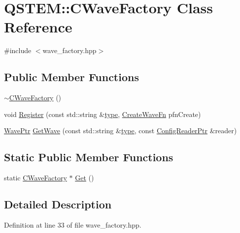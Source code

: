 \hypertarget{class_q_s_t_e_m_1_1_c_wave_factory}{\section{Q\-S\-T\-E\-M\-:\-:C\-Wave\-Factory Class Reference}
\label{class_q_s_t_e_m_1_1_c_wave_factory}
}


{\ttfamily \#include $<$wave\-\_\-factory.\-hpp$>$}

\subsection*{Public Member Functions}
\begin{DoxyCompactItemize}
\item 
\hyperlink{class_q_s_t_e_m_1_1_c_wave_factory_a7660b230eda968e716eb759cadd47140}{$\sim$\-C\-Wave\-Factory} ()
\item 
void \hyperlink{class_q_s_t_e_m_1_1_c_wave_factory_aaad881e1f91759b4536f031a434ab83e}{Register} (const std\-::string \&\hyperlink{convert2cfg_8m_a2902a7a983ab04c79cae2162ad553481}{type}, \hyperlink{namespace_q_s_t_e_m_a50bc76f65725c2a74ed6a8c6e2fd6725}{Create\-Wave\-Fn} pfn\-Create)
\item 
\hyperlink{namespace_q_s_t_e_m_ab42c5fe058973736465964e84b504b74}{Wave\-Ptr} \hyperlink{class_q_s_t_e_m_1_1_c_wave_factory_a61fdfc3b96fb96cb65171189a1812c6f}{Get\-Wave} (const std\-::string \&\hyperlink{convert2cfg_8m_a2902a7a983ab04c79cae2162ad553481}{type}, const \hyperlink{namespace_q_s_t_e_m_af9424707fe9f6503298f49b41304bd35}{Config\-Reader\-Ptr} \&reader)
\end{DoxyCompactItemize}
\subsection*{Static Public Member Functions}
\begin{DoxyCompactItemize}
\item 
static \hyperlink{class_q_s_t_e_m_1_1_c_wave_factory}{C\-Wave\-Factory} $\ast$ \hyperlink{class_q_s_t_e_m_1_1_c_wave_factory_a6cf3c5ed3e45d70bdf6344cb95e0058d}{Get} ()
\end{DoxyCompactItemize}


\subsection{Detailed Description}


Definition at line 33 of file wave\-\_\-factory.\-hpp.



